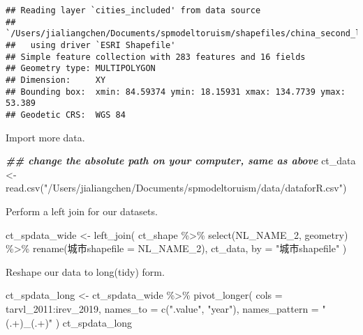 \documentclass[
]{article}
\newenvironment{Shaded}{\begin{snugshade}}{\end{snugshade}}
\newcommand{\AttributeTok}[1]{\textcolor[rgb]{0.77,0.63,0.00}{#1}}
\newcommand{\DocumentationTok}[1]{\textcolor[rgb]{0.56,0.35,0.01}{\textbf{\textit{#1}}}}
\newcommand{\FunctionTok}[1]{\textcolor[rgb]{0.00,0.00,0.00}{#1}}
\newcommand{\NormalTok}[1]{#1}
\newcommand{\OtherTok}[1]{\textcolor[rgb]{0.56,0.35,0.01}{#1}}
\newcommand{\SpecialCharTok}[1]{\textcolor[rgb]{0.00,0.00,0.00}{#1}}
\newcommand{\StringTok}[1]{\textcolor[rgb]{0.31,0.60,0.02}{#1}}
\begin{document}
\begin{verbatim}
## Reading layer `cities_included' from data source 
##   `/Users/jialiangchen/Documents/spmodeltoruism/shapefiles/china_second_level_admin_shape/cities_included.shp' 
##   using driver `ESRI Shapefile'
## Simple feature collection with 283 features and 16 fields
## Geometry type: MULTIPOLYGON
## Dimension:     XY
## Bounding box:  xmin: 84.59374 ymin: 18.15931 xmax: 134.7739 ymax: 53.389
## Geodetic CRS:  WGS 84
\end{verbatim}

Import more data.

\begin{Shaded}
\begin{Highlighting}[]
\DocumentationTok{\#\# change the absolute path on your computer, same as above}
\NormalTok{ct\_data }\OtherTok{\textless{}{-}} \FunctionTok{read.csv}\NormalTok{(}\StringTok{"/Users/jialiangchen/Documents/spmodeltoruism/data/dataforR.csv"}\NormalTok{)}
\end{Highlighting}
\end{Shaded}

Perform a left join for our datasets.

\begin{Shaded}
\begin{Highlighting}[]
\NormalTok{ct\_spdata\_wide }\OtherTok{\textless{}{-}} \FunctionTok{left\_join}\NormalTok{(}
\NormalTok{  ct\_shape }\SpecialCharTok{\%\textgreater{}\%} \FunctionTok{select}\NormalTok{(NL\_NAME\_2, geometry) }\SpecialCharTok{\%\textgreater{}\%} \FunctionTok{rename}\NormalTok{(城市}\AttributeTok{shapefile =}\NormalTok{ NL\_NAME\_2),  }
\NormalTok{  ct\_data,}
  \AttributeTok{by =} \StringTok{"城市shapefile"}
\NormalTok{)}
\end{Highlighting}
\end{Shaded}

Reshape our data to long(tidy) form.

\begin{Shaded}
\begin{Highlighting}[]
\NormalTok{ct\_spdata\_long }\OtherTok{\textless{}{-}}\NormalTok{ ct\_spdata\_wide }\SpecialCharTok{\%\textgreater{}\%} 
  \FunctionTok{pivot\_longer}\NormalTok{(}
    \AttributeTok{cols =}\NormalTok{ tarvl\_2011}\SpecialCharTok{:}\NormalTok{irev\_2019,}
    \AttributeTok{names\_to =} \FunctionTok{c}\NormalTok{(}\StringTok{".value"}\NormalTok{, }\StringTok{"year"}\NormalTok{),}
    \AttributeTok{names\_pattern =} \StringTok{"(.+)\_(.+)"}
\NormalTok{  )}
\NormalTok{ct\_spdata\_long}
\end{Highlighting}
\end{Shaded}
\end{document}
